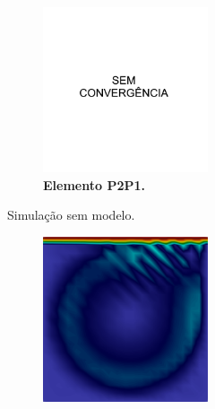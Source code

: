 \begin{figure}[h!]
\begin{subfigure}{\textwidth}
\begin{subfigure}{\textwidth}
\begin{subfigure}{.32\textwidth}
            \end{subfigure}
            \begin{subfigure}{.32\textwidth}
                \caption*{\textbf{Elemento P2P1.}}
                \includegraphics[width=\linewidth]{Figuras/cavity-poor/None-TH.png}
            \end{subfigure}
            \caption{Simulação sem modelo.}
        \end{subfigure}
        \begin{subfigure}{\textwidth}\centering
            \begin{subfigure}{.32\textwidth}
                \includegraphics[width=\linewidth]{Figuras/cavity-poor/LES-Lin.png}

\end{subfigure}
\end{subfigure}
\end{subfigure}
\end{figure}
